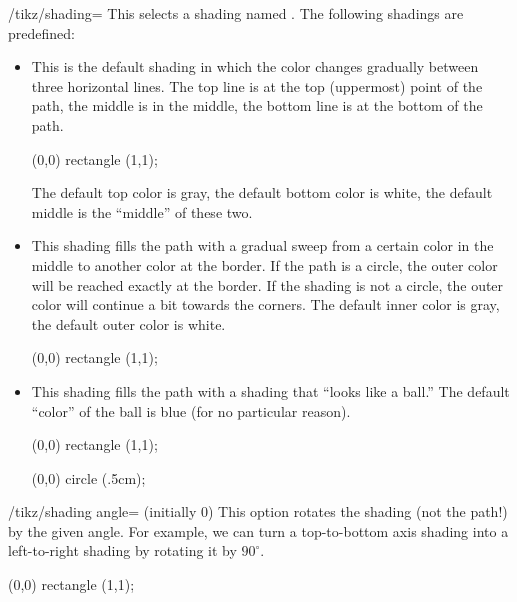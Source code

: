 \begin{key}{/tikz/shading=}
  This selects a shading named . The following shadings are
  predefined:
  \begin{itemize}
  \item {}
    This is the default shading in which the color changes gradually
    between three horizontal lines. The top line is at the top
    (uppermost) point of the path, the middle is in the middle, the
    bottom line is at the bottom of the path.

\begin{codeexample}[]
\tikz \shadedraw [shading=axis] (0,0) rectangle (1,1);
\end{codeexample}

    The default top color is gray, the default bottom color is white,
    the default middle is the ``middle'' of these two.
  \item {}
    This shading fills the path with a gradual sweep from a certain
    color in the middle to another color at the border. If the path is
    a circle, the outer color will be reached exactly at the
    border. If the shading is not a circle, the outer color will
    continue a bit towards the corners. The default inner color is
    gray, the default outer color is white.

\begin{codeexample}[]
\tikz \shadedraw [shading=radial] (0,0) rectangle (1,1);
\end{codeexample}
  \item {}
    This shading fills the path with a shading that ``looks like a
    ball.'' The default ``color'' of the ball is blue (for no
    particular reason).

\begin{codeexample}[]
\tikz \shadedraw [shading=ball] (0,0) rectangle (1,1);
\end{codeexample}

\begin{codeexample}[]
\tikz \shadedraw [shading=ball] (0,0) circle (.5cm);
\end{codeexample}
  \end{itemize}

  \begin{key}{/tikz/shading angle= (initially 0)}
    This option rotates the shading (not the path!) by the given
    angle. For example, we can turn a top-to-bottom axis shading into a
    left-to-right shading by rotating it by $90^\circ$.

\begin{codeexample}[]
\tikz \shadedraw [shading=axis,shading angle=90] (0,0) rectangle (1,1);
\end{codeexample}
  \end{key}
\end{key}

